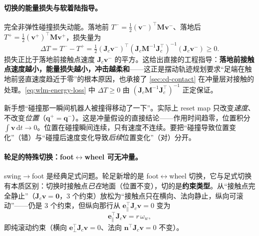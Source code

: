 \paragraph{切换的能量损失与软着陆指导。}
完全非弹性碰撞损失动能。落地前 $T^-=\tfrac12(\mathbf v^-)^\top\mathbf M\mathbf v^-$、落地后 $T^+=\tfrac12(\mathbf v^+)^\top\mathbf M\mathbf v^+$，损失量为
\begin{equation}
  \Delta T=T^--T^+=\tfrac12(\mathbf J_c\mathbf v^-)^\top(\mathbf J_c\mathbf M^{-1}\mathbf J_c^\top)^{-1}(\mathbf J_c\mathbf v^-)\ge0.
  \label{eq:wlm-energy-loss}
\end{equation}
损失正比于落地前接触点速度 $\mathbf J_c\mathbf v^-$ 的平方。这给出直接的工程指导：\textbf{落地前接触点速度越小，能量损失越小，冲击越柔和}——这正是摆动轨迹规划要求“足端在触地前竖直速度趋近于零”的根本原因，也承接了 \cref{sec:cd-contact} 在冲量层对接触的处理。\cref{eq:wlm-energy-loss} 中 $\Delta T\ge0$ 由 $(\mathbf J_c\mathbf M^{-1}\mathbf J_c^\top)^{-1}$ 正定保证。

\begin{pitfall}\label{pf:wlm-pos}
新手想“碰撞那一瞬间机器人被撞得移动了一下”。实际上 reset map 只改变\emph{速度}、不改变\emph{位置}（$\mathbf q^+=\mathbf q^-$）。这是冲量假设的直接结论——作用时间趋零，位置积分 $\int\mathbf v\,\mathrm dt\to0$。位置在碰撞瞬间连续，只有速度不连续。要把“碰撞导致位置变化”（错）与“碰撞后速度变化导致\emph{后续}位置变化”（对）分开。
\end{pitfall}

\paragraph{轮足的特殊切换：foot$\leftrightarrow$wheel 可无冲量。}
swing$\to$foot 是经典足式问题。轮足新增的是 foot$\leftrightarrow$wheel 切换，它与足式切换有本质区别：切换时接触点\emph{已在}地面（位置不变），切的是\textbf{约束类型}。从“接触点完全静止”（$\mathbf J_c\mathbf v=\mathbf0$，$3$ 个约束）放松为“接触点只在横向、法向静止，纵向可滚动”——仍是 $3$ 个约束，但纵向那行从 $\mathbf e_\parallel^\top\mathbf J_c\mathbf v=0$ 变为
\begin{equation}
  \mathbf e_\parallel^\top\mathbf J_c\mathbf v=r\,\omega_w,
  \label{eq:wlm-rolling}
\end{equation}
即纯滚动约束（横向 $\mathbf e_\perp^\top\mathbf J_c\mathbf v=0$、法向 $\mathbf n^\top\mathbf J_c\mathbf v=0$ 不变）。

